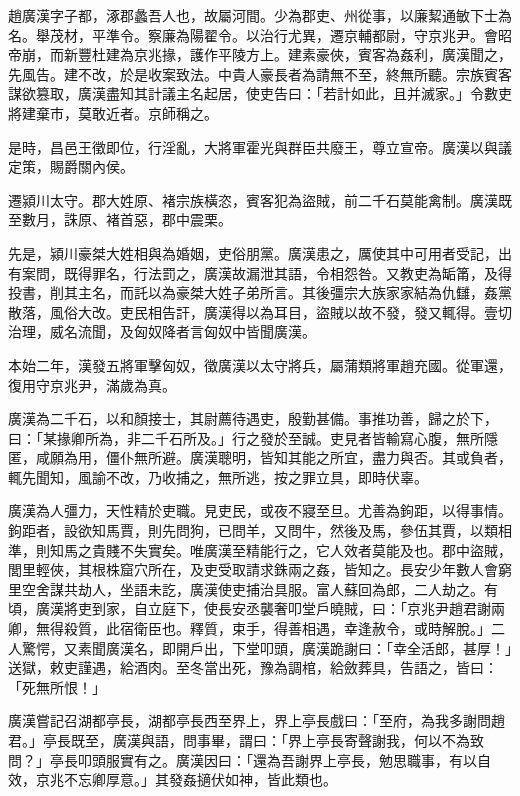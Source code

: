 
\begin{pinyinscope}
趙廣漢字子都，涿郡蠡吾人也，故屬河間。少為郡吏、州從事，以廉絜通敏下士為名。舉茂材，平準令。察廉為陽翟令。以治行尤異，遷京輔都尉，守京兆尹。會昭帝崩，而新豐杜建為京兆掾，護作平陵方上。建素豪俠，賓客為姦利，廣漢聞之，先風告。建不改，於是收案致法。中貴人豪長者為請無不至，終無所聽。宗族賓客謀欲篡取，廣漢盡知其計議主名起居，使吏告曰：「若計如此，且并滅家。」令數吏將建棄巿，莫敢近者。京師稱之。

是時，昌邑王徵即位，行淫亂，大將軍霍光與群臣共廢王，尊立宣帝。廣漢以與議定策，賜爵關內侯。

遷潁川太守。郡大姓原、褚宗族橫恣，賓客犯為盜賊，前二千石莫能禽制。廣漢既至數月，誅原、褚首惡，郡中震栗。

先是，潁川豪桀大姓相與為婚姻，吏俗朋黨。廣漢患之，厲使其中可用者受記，出有案問，既得罪名，行法罰之，廣漢故漏泄其語，令相怨咎。又教吏為缿筩，及得投書，削其主名，而託以為豪桀大姓子弟所言。其後彊宗大族家家結為仇讎，姦黨散落，風俗大改。吏民相告訐，廣漢得以為耳目，盜賊以故不發，發又輒得。壹切治理，威名流聞，及匈奴降者言匈奴中皆聞廣漢。

本始二年，漢發五將軍擊匈奴，徵廣漢以太守將兵，屬蒲類將軍趙充國。從軍還，復用守京兆尹，滿歲為真。

廣漢為二千石，以和顏接士，其尉薦待遇吏，殷勤甚備。事推功善，歸之於下，曰：「某掾卿所為，非二千石所及。」行之發於至誠。吏見者皆輸寫心腹，無所隱匿，咸願為用，僵仆無所避。廣漢聰明，皆知其能之所宜，盡力與否。其或負者，輒先聞知，風諭不改，乃收捕之，無所逃，按之罪立具，即時伏辜。

廣漢為人彊力，天性精於吏職。見吏民，或夜不寢至旦。尤善為鉤距，以得事情。鉤距者，設欲知馬賈，則先問狗，已問羊，又問牛，然後及馬，參伍其賈，以類相準，則知馬之貴賤不失實矣。唯廣漢至精能行之，它人效者莫能及也。郡中盜賊，閭里輕俠，其根株窟穴所在，及吏受取請求銖兩之姦，皆知之。長安少年數人會窮里空舍謀共劫人，坐語未訖，廣漢使吏捕治具服。富人蘇回為郎，二人劫之。有頃，廣漢將吏到家，自立庭下，使長安丞襲奢叩堂戶曉賊，曰：「京兆尹趙君謝兩卿，無得殺質，此宿衛臣也。釋質，束手，得善相遇，幸逢赦令，或時解脫。」二人驚愕，又素聞廣漢名，即開戶出，下堂叩頭，廣漢跪謝曰：「幸全活郎，甚厚！」送獄，敕吏謹遇，給酒肉。至冬當出死，豫為調棺，給斂葬具，告語之，皆曰：「死無所恨！」

廣漢嘗記召湖都亭長，湖都亭長西至界上，界上亭長戲曰：「至府，為我多謝問趙君。」亭長既至，廣漢與語，問事畢，謂曰：「界上亭長寄聲謝我，何以不為致問？」亭長叩頭服實有之。廣漢因曰：「還為吾謝界上亭長，勉思職事，有以自效，京兆不忘卿厚意。」其發姦擿伏如神，皆此類也。


\end{pinyinscope}
